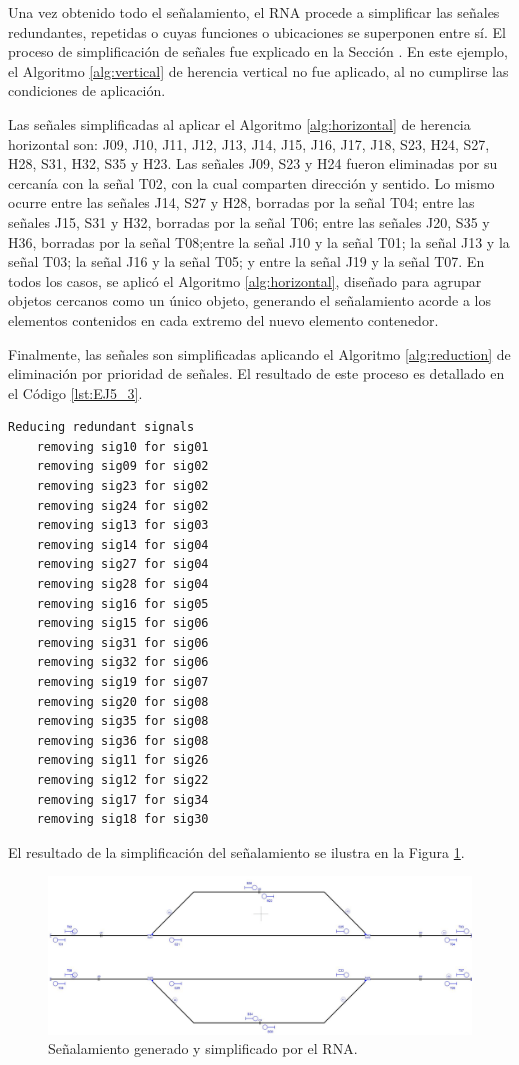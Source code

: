 	Una vez obtenido todo el señalamiento, el RNA procede a simplificar las señales redundantes, repetidas o cuyas funciones o ubicaciones se superponen entre sí. El proceso de simplificación de señales fue explicado en la Sección \label{sec:simplificacion}. En este ejemplo, el Algoritmo \ref{alg:vertical} de herencia vertical no fue aplicado, al no cumplirse las condiciones de aplicación.
	
	Las señales simplificadas al aplicar el Algoritmo \ref{alg:horizontal} de herencia horizontal son: J09, J10, J11, J12, J13, J14, J15, J16, J17, J18, S23, H24, S27, H28, S31, H32, S35 y H23. Las señales J09, S23 y H24 fueron eliminadas por su cercanía con la señal T02, con la cual comparten dirección y sentido. Lo mismo ocurre entre las señales J14, S27 y H28, borradas por la señal T04; entre las señales J15, S31 y H32, borradas por la señal T06; entre las señales J20, S35 y H36, borradas por la señal T08;entre la señal J10 y la señal T01; la señal J13 y la señal T03; la señal J16 y la señal T05; y entre la señal J19 y la señal T07. En todos los casos, se aplicó el Algoritmo \ref{alg:horizontal}, diseñado para agrupar objetos cercanos como un único objeto, generando el señalamiento acorde a los elementos contenidos en cada extremo del nuevo elemento contenedor.
	
	Finalmente, las señales son simplificadas aplicando el Algoritmo \ref{alg:reduction} de eliminación por prioridad de señales. El resultado de este proceso es detallado en el Código \ref{lst:EJ5_3}.
	
	\begin{lstlisting}[language = {}, caption = Reducción de señalamiento por prioridad de señales, label = {lst:EJ5_3}]
	Reducing redundant signals
	removing sig10 for sig01
	removing sig09 for sig02
	removing sig23 for sig02
	removing sig24 for sig02
	removing sig13 for sig03
	removing sig14 for sig04
	removing sig27 for sig04
	removing sig28 for sig04
	removing sig16 for sig05
	removing sig15 for sig06
	removing sig31 for sig06
	removing sig32 for sig06
	removing sig19 for sig07
	removing sig20 for sig08
	removing sig35 for sig08
	removing sig36 for sig08
	removing sig11 for sig26
	removing sig12 for sig22
	removing sig17 for sig34
	removing sig18 for sig30
	\end{lstlisting}
	
	El resultado de la simplificación del señalamiento se ilustra en la Figura \ref{fig:EJ5_7}.
	
	\begin{figure}[H]
		\centering
		\includegraphics[width=1\textwidth]{resultados-obtenidos/ejemplo5/images/5_RNA.png}
		\centering\caption{Señalamiento generado y simplificado por el RNA.}
		\label{fig:EJ5_7}
	\end{figure}
	
